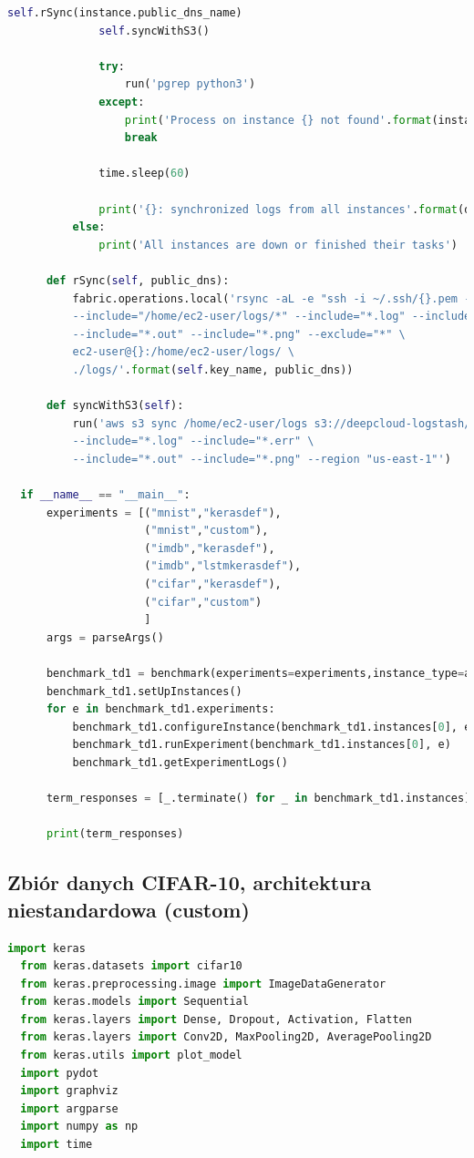 \documentclass[12pt,a4paper,twoside]{article}
\begin{document}
\begin{appendices}
\begin{lstlisting}[language=python]
              self.rSync(instance.public_dns_name)
              self.syncWithS3()

              try:
                  run('pgrep python3')
              except:
                  print('Process on instance {} not found'.format(instance.id))
                  break

              time.sleep(60)

              print('{}: synchronized logs from all instances'.format(datetime.datetime.now().isoformat()))
          else:
              print('All instances are down or finished their tasks')

      def rSync(self, public_dns):
          fabric.operations.local('rsync -aL -e "ssh -i ~/.ssh/{}.pem -o StrictHostKeyChecking=no" \
          --include="/home/ec2-user/logs/*" --include="*.log" --include="*.err" \
          --include="*.out" --include="*.png" --exclude="*" \
          ec2-user@{}:/home/ec2-user/logs/ \
          ./logs/'.format(self.key_name, public_dns))

      def syncWithS3(self):
          run('aws s3 sync /home/ec2-user/logs s3://deepcloud-logstash/ --exclude="*"\
          --include="*.log" --include="*.err" \
          --include="*.out" --include="*.png" --region "us-east-1"')

  if __name__ == "__main__":
      experiments = [("mnist","kerasdef"),
                     ("mnist","custom"),
                     ("imdb","kerasdef"),
                     ("imdb","lstmkerasdef"),
                     ("cifar","kerasdef"),
                     ("cifar","custom")
                     ]
      args = parseArgs()

      benchmark_td1 = benchmark(experiments=experiments,instance_type=args.instance_type)
      benchmark_td1.setUpInstances()
      for e in benchmark_td1.experiments:
          benchmark_td1.configureInstance(benchmark_td1.instances[0], e)
          benchmark_td1.runExperiment(benchmark_td1.instances[0], e)
          benchmark_td1.getExperimentLogs()

      term_responses = [_.terminate() for _ in benchmark_td1.instances]

      print(term_responses)

\end{lstlisting}
\clearpage

\subsection{Zbiór danych CIFAR-10, architektura niestandardowa (custom)}
\begin{lstlisting}[language=python]
  import keras
  from keras.datasets import cifar10
  from keras.preprocessing.image import ImageDataGenerator
  from keras.models import Sequential
  from keras.layers import Dense, Dropout, Activation, Flatten
  from keras.layers import Conv2D, MaxPooling2D, AveragePooling2D
  from keras.utils import plot_model
  import pydot
  import graphviz
  import argparse
  import numpy as np
  import time


\end{lstlisting}
\end{appendices}
\end{document}
